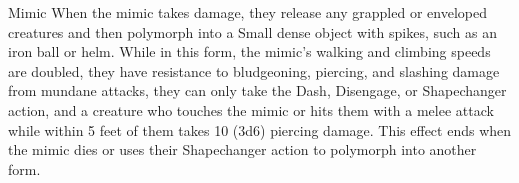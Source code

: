 \documentclass[10pt,a4paper,twoside,bg=print,twocolumn,openany,nodeprecatedcode]{dndbook}
\begin{document}
\begin{DndMonster}[float=t]{Mimic}
When the mimic takes damage, they release any grappled or enveloped creatures and then polymorph into a Small dense object with spikes, such as an iron ball or helm. While in this form, the mimic's walking and climbing speeds are doubled, they have resistance to bludgeoning, piercing, and slashing damage from mundane attacks, they can only take the Dash, Disengage, or Shapechanger action, and a creature who touches the mimic or hits them with a melee attack while within 5 feet of them takes 10 (3d6) piercing damage. This effect ends when the mimic dies or uses their Shapechanger action to polymorph into another form.

\end{DndMonster}
\end{document}
